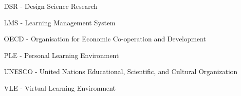 DSR - Design Science Research

LMS - Learning Management System

OECD - Organisation for Economic Co-operation and Development

PLE - Personal Learning Environment

UNESCO - United Nations Educational, Scientific, and Cultural Organization

VLE - Virtual Learning Environment




